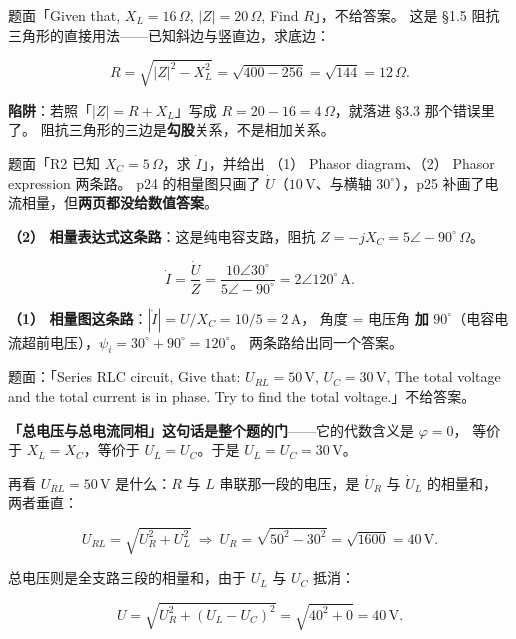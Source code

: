 \documentclass[11pt]{ctexart}
\begin{document}

题面「Given that, $X_L=16\,\Omega$, $|Z|=20\,\Omega$, Find $R$」，不给答案。
这是 §1.5 阻抗三角形的直接用法——已知斜边与竖直边，求底边：

\[ R=\sqrt{|Z|^{2}-X_L^{2}}=\sqrt{400-256}=\sqrt{144}=12\,\Omega . \]

\textbf{陷阱}：若照「$|Z|=R+X_L$」写成 $R=20-16=4\,\Omega$，就落进 §3.3 那个错误里了。
阻抗三角形的三边是\textbf{勾股}关系，不是相加关系。


题面「R2 已知 $X_C=5\,\Omega$，求 $\dot I$」，并给出 （1） Phasor diagram、（2） Phasor expression 两条路。
p24 的相量图只画了 $\dot U$（$10\,\mathrm{V}$、与横轴 $30^\circ$），p25 补画了电流相量，但\textbf{两页都没给数值答案}。

\textbf{（2） 相量表达式这条路}：这是纯电容支路，阻抗 $Z=-jX_C=5\angle-90^\circ\,\Omega$。

\[ \dot I=\frac{\dot U}{Z}=\frac{10\angle30^\circ}{5\angle-90^\circ}=2\angle120^\circ\,\mathrm{A} . \]

\textbf{（1） 相量图这条路}：$|\dot I|=U/X_C=10/5=2\,\mathrm{A}$，
角度 = 电压角 \textbf{加} $90^\circ$（电容电流超前电压），$\psi_i=30^\circ+90^\circ=120^\circ$。
两条路给出同一个答案。


题面：「Series RLC circuit, Give that: $U_{RL}=50\,\mathrm{V}$, $U_C=30\,\mathrm{V}$,
The total voltage and the total current is in phase. Try to find the total voltage.」不给答案。

\textbf{「总电压与总电流同相」这句话是整个题的门}——它的代数含义是 $\varphi=0$，
等价于 $X_L=X_C$，等价于 $U_L=U_C$。于是 $U_L=U_C=30\,\mathrm{V}$。

再看 $U_{RL}=50\,\mathrm{V}$ 是什么：$R$ 与 $L$ 串联那一段的电压，是 $\dot U_R$ 与 $\dot U_L$ 的相量和，
两者垂直：

\[ U_{RL}=\sqrt{U_R^{2}+U_L^{2}}\ \Longrightarrow\
   U_R=\sqrt{50^{2}-30^{2}}=\sqrt{1600}=40\,\mathrm{V} . \]

总电压则是全支路三段的相量和，由于 $U_L$ 与 $U_C$ 抵消：

\[ U=\sqrt{U_R^{2}+(U_L-U_C)^{2}}=\sqrt{40^{2}+0}=40\,\mathrm{V} . \]
\end{document}
